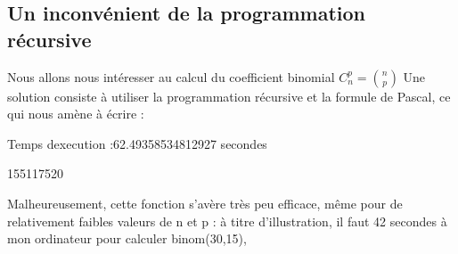 \documentclass[letterpaper,10pt,english]{jupyterBook}
\begin{document}
\subsection{Un inconvénient de la programmation récursive}
\label{\detokenize{notebooks/dynamicProgramming/ProgrammationDynamique:un-inconvenient-de-la-programmation-recursive}}
\sphinxAtStartPar
Nous allons nous intéresser au calcul du coefficient binomial \(C^p_n=\binom{n}{p}\) Une solution consiste à utiliser la programmation récursive et la formule de Pascal, ce qui nous amène à écrire :
\begin{sphinxVerbatimInput}

\begin{sphinxVerbatim}[commandchars=\\\{\}]
  
           
         
            
\end{sphinxVerbatim}
\end{sphinxVerbatimInput}
\begin{sphinxVerbatimInput}

\begin{sphinxVerbatim}[commandchars=\\\{\}]
\end{sphinxVerbatim}
\end{sphinxVerbatimInput}
\begin{sphinxVerbatimOutput}

\begin{sphinxVerbatim}[commandchars=\\\{\}]
Temps d\PYGZsq{}execution :62.49358534812927 secondes 
\end{sphinxVerbatim}

\begin{sphinxVerbatim}[commandchars=\\\{\}]
155117520
\end{sphinxVerbatim}
\end{sphinxVerbatimOutput}

\sphinxAtStartPar
Malheureusement, cette fonction s’avère très peu efficace, même pour de relativement faibles valeurs de n et p : à titre d’illustration, il faut 42 secondes à mon ordinateur pour calculer  binom(30,15),
\end{document}
